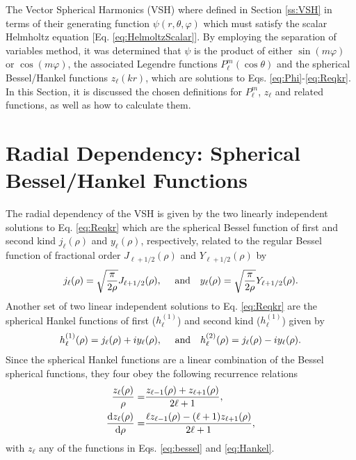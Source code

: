 
The Vector Spherical Harmonics (VSH) where defined in Section \ref{ss:VSH} in terms of their generating function $\psi(r,\theta,\varphi)$ which must satisfy the scalar Helmholtz equation [Eq.  \eqref{eq:HelmoltzScalar}]. By employing the separation of variables method,  it was determined that $\psi$ is the product of either $\sin(m\varphi)$ or $\cos(m\varphi)$, the associated Legendre functions $P_\ell^m(\cos\theta)$ and the spherical Bessel/Hankel functions $z_\ell(kr)$, which are solutions to Eqs. \eqref{eq:Phi}-\eqref{eq:Reqkr}. In this Section, it is discussed the chosen definitions for $P_\ell^m$, $z_\ell$ and related functions, as well as how to calculate them.

\section*{Radial Dependency: Spherical Bessel/Hankel Functions}

%
%
%
%
%
The radial dependency of the VSH is given by the two linearly independent solutions to Eq. \eqref{eq:Reqkr} which are the spherical Bessel function of first and second kind $j_\ell(\rho)$ and $y_\ell(\rho)$, respectively, related to the regular Bessel function of fractional order $J_{\ell+1/2}(\rho)$ and  $Y_{\ell+1/2}(\rho)$ by  \cite{abramowitz_handbook_2013}
%
\begin{align}
j_\ell(\rho) = \sqrt{\frac{\pi}{2 \rho}}J_{\ell+1/2}(\rho),\qqtext{ and}
y_\ell(\rho) = \sqrt{\frac{\pi}{2\rho}}Y_{\ell+1/2}(\rho).
\label{eq:bessel}
\end{align}
%
Another set of two linear independent solutions to  Eq. \eqref{eq:Reqkr} are the spherical Hankel functions  of first ($h^{(1)}_\ell$)  and second kind ($h^{(1)}_\ell$) given by \cite{abramowitz_handbook_2013}
%
\begin{align}
h^{(1)}_\ell(\rho) = j_\ell(\rho) + i y_\ell(\rho),\qqtext{ and}
h^{(2)}_\ell(\rho) = j_\ell(\rho) - i y_\ell(\rho).
\label{eq:Hankel}
\end{align}
%
Since the spherical Hankel functions are a linear combination of the Bessel spherical functions, they four obey the following recurrence relations \cite{abramowitz_handbook_2013}
%
\begin{align}
\frac{z_\ell(\rho)}{\rho} =& \frac{z_{\ell-1}(\rho) + z_{\ell+1}(\rho)}{2\ell + 1},
\label{eq:recBessel1}\\
\dv{z_\ell(\rho)}{\rho} =& \frac{\ell z_{\ell-1}(\rho) - (\ell+1)z_{\ell+1}(\rho)}{2\ell + 1} ,
\label{eq:recBessel2}
\end{align}
%
with $z_\ell$ any of the functions in Eqs. \eqref{eq:bessel} and \eqref{eq:Hankel}.


